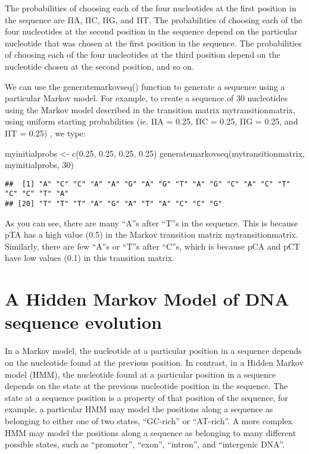 \documentclass[
]{book}
\newenvironment{Shaded}{\begin{snugshade}}{\end{snugshade}}
\newcommand{\DecValTok}[1]{\textcolor[rgb]{0.00,0.00,0.81}{#1}}
\newcommand{\FloatTok}[1]{\textcolor[rgb]{0.00,0.00,0.81}{#1}}
\newcommand{\FunctionTok}[1]{\textcolor[rgb]{0.00,0.00,0.00}{#1}}
\newcommand{\NormalTok}[1]{#1}
\newcommand{\OtherTok}[1]{\textcolor[rgb]{0.56,0.35,0.01}{#1}}
\begin{document}
The probabilities of choosing each of the four nucleotides at the first position in the sequence are ΠA, ΠC, ΠG, and ΠT. The probabilities of choosing each of the four nucleotides at the second position in the sequence depend on the particular nucleotide that was chosen at the first position in the sequence. The probabilities of choosing each of the four nucleotides at the third position depend on the nucleotide chosen at the second position, and so on.

We can use the generatemarkovseq() function to generate a sequence using a particular Markov model. For example, to create a sequence of 30 nucleotides using the Markov model described in the transition matrix mytransitionmatrix, using uniform starting probabilities (ie. ΠA = 0.25, ΠC = 0.25, ΠG = 0.25, and ΠT = 0.25) , we type:

\begin{Shaded}
\begin{Highlighting}[]
\NormalTok{myinitialprobs }\OtherTok{\textless{}{-}} \FunctionTok{c}\NormalTok{(}\FloatTok{0.25}\NormalTok{, }\FloatTok{0.25}\NormalTok{, }\FloatTok{0.25}\NormalTok{, }\FloatTok{0.25}\NormalTok{)}
\FunctionTok{generatemarkovseq}\NormalTok{(mytransitionmatrix, myinitialprobs, }\DecValTok{30}\NormalTok{)}
\end{Highlighting}
\end{Shaded}

\begin{verbatim}
##  [1] "A" "C" "C" "A" "A" "G" "A" "G" "T" "A" "G" "C" "A" "C" "T" "C" "C" "T" "A"
## [20] "T" "T" "T" "A" "G" "A" "T" "A" "C" "C" "G"
\end{verbatim}

As you can see, there are many ``A''s after ``T''s in the sequence. This is because pTA has a high value (0.5) in the Markov transition matrix mytransitionmatrix. Similarly, there are few ``A''s or ``T''s after ``C''s, which is because pCA and pCT have low values (0.1) in this transition matrix.

\hypertarget{a-hidden-markov-model-of-dna-sequence-evolution}{%
\section{A Hidden Markov Model of DNA sequence evolution}\label{a-hidden-markov-model-of-dna-sequence-evolution}}

In a Markov model, the nucleotide at a particular position in a sequence depends on the nucleotide found at the previous position. In contrast, in a Hidden Markov model (HMM), the nucleotide found at a particular position in a sequence depends on the state at the previous nucleotide position in the sequence. The state at a sequence position is a property of that position of the sequence, for example, a particular HMM may model the positions along a sequence as belonging to either one of two states, ``GC-rich'' or ``AT-rich''. A more complex HMM may model the positions along a sequence as belonging to many different possible states, such as ``promoter'', ``exon'', ``intron'', and ``intergenic DNA''.
\end{document}
